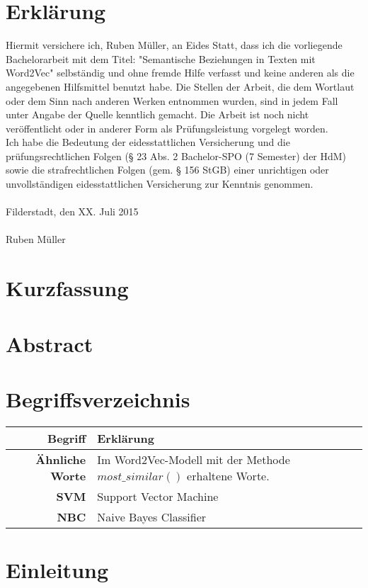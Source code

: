 \documentclass[12pt,a4paper]{report}
\begin{document}
\chapter*{Erklärung}
Hiermit versichere ich, Ruben Müller, an Eides Statt, dass ich die vorliegende
Bachelorarbeit mit dem Titel: "Semantische Beziehungen in Texten mit Word2Vec" selbständig und ohne fremde Hilfe verfasst und keine anderen als die angegebenen
Hilfsmittel benutzt habe. Die Stellen der Arbeit, die dem Wortlaut oder dem Sinn nach anderen
Werken entnommen wurden, sind in jedem Fall unter Angabe der Quelle kenntlich gemacht. Die
Arbeit ist noch nicht veröffentlicht oder in anderer Form als Prüfungsleistung vorgelegt worden.\\
Ich habe die Bedeutung der eidesstattlichen Versicherung und die prüfungsrechtlichen Folgen (§ 23 Abs. 2 Bachelor-SPO (7 Semester) der HdM) sowie die strafrechtlichen Folgen (gem. § 156 StGB) einer unrichtigen oder
unvollständigen eidesstattlichen Versicherung zur Kenntnis genommen.\\
\vspace{1em}\\
Filderstadt, den XX. Juli 2015\\
\vspace{5em}\\
Ruben Müller


\newpage
\chapter*{Kurzfassung}
\newpage
\chapter*{Abstract}
\newpage
\tableofcontents
\newpage
\chapter*{Begriffsverzeichnis}
	\begin{tabular}{r|l}	
	\textbf{Begriff} & Erklärung\\
	\hline	
	\textbf{Ähnliche Worte} & Im Word2Vec-Modell mit der Methode $most\_similar()$ erhaltene Worte.\\
	\textbf{SVM} & Support Vector Machine\\
	\textbf{NBC} & Naive Bayes Classifier\\

\end{tabular}
\newpage
{}
\chapter{Einleitung}
\end{document}

